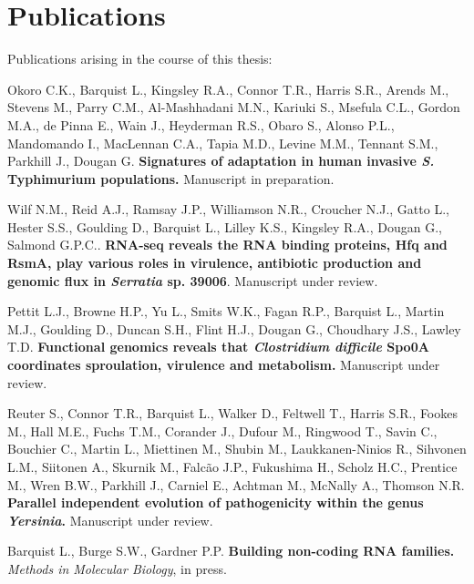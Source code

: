 \chapter{Publications}

Publications arising in the course of this thesis:

\itemize

\item{Okoro C.K., Barquist L., Kingsley R.A., Connor T.R., Harris S.R., Arends M., Stevens M., Parry C.M., Al-Mashhadani M.N., Kariuki S., Msefula C.L., Gordon M.A., de Pinna E., Wain J., Heyderman R.S., Obaro S., Alonso P.L., Mandomando I., MacLennan C.A., Tapia M.D., Levine M.M., Tennant S.M., Parkhill J., Dougan G.  \textbf{Signatures of adaptation in human invasive \textit{S.} Typhimurium populations.} Manuscript in preparation.} 

\item{Wilf N.M., Reid A.J., Ramsay J.P., Williamson N.R., Croucher N.J., Gatto L., Hester S.S., Goulding D., Barquist L., Lilley K.S., Kingsley R.A., Dougan G., Salmond G.P.C.. \textbf{RNA-seq reveals the RNA binding proteins, Hfq and RsmA, play various roles in virulence, antibiotic production and genomic flux in \textit{Serratia} sp. 39006}. Manuscript under review.}

\item{Pettit L.J., Browne H.P., Yu L., Smits W.K., Fagan R.P., Barquist L., Martin M.J., Goulding D., Duncan S.H., Flint H.J., Dougan G., Choudhary J.S., Lawley T.D. \textbf{Functional genomics reveals that \textit{Clostridium difficile} Spo0A coordinates sproulation, virulence and metabolism.} Manuscript under review.}

\item{Reuter S., Connor T.R., Barquist L., Walker D., Feltwell T., Harris S.R., Fookes M., Hall M.E., Fuchs T.M., Corander J., Dufour M., Ringwood T., Savin C., Bouchier C., Martin L., Miettinen M., Shubin M., Laukkanen-Ninios R., Sihvonen L.M., Siitonen A., Skurnik M., Falc\~{a}o J.P., Fukushima H., Scholz H.C., Prentice M., Wren B.W., Parkhill J., Carniel E., Achtman M., McNally A., Thomson N.R. \textbf{Parallel independent evolution of pathogenicity within the genus \textit{Yersinia}.} Manuscript under review.}

\newpage

\item{Barquist L., Burge S.W., Gardner P.P. \textbf{Building non-coding RNA families.} \textit{Methods in Molecular Biology}, in press.} 

